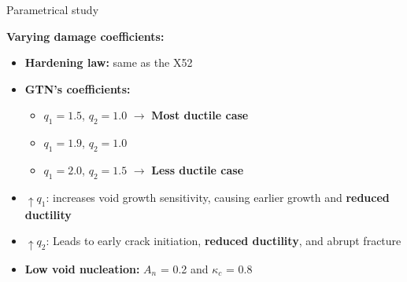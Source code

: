 \documentclass[9pt]{beamer}
\begin{document}
\begin{frame}{Parametrical study}

	\textcolor{MINESBlue}{\textbf{Varying damage coefficients:}}
	\vspace{0.3cm}
    \begin{itemize}
        \item \textbf{Hardening law:} same as the X52
        \vspace{0.5cm}
        \item \textbf{GTN's coefficients:}
        \vspace{0.2cm}
        \begin{itemize}
            \item $q_1 = 1.5$, $q_2 = 1.0$ $\rightarrow$ \textbf{Most ductile case}
            \vspace{0.2cm}
            \item $q_1 = 1.9$, $q_2 = 1.0$
            \vspace{0.2cm}
            \item $q_1 = 2.0$, $q_2 = 1.5$ $\rightarrow$ \textbf{Less ductile case}
        \end{itemize}
        \vspace{0.4cm}
        \item $\uparrow q_1$: increases void growth sensitivity, causing earlier growth and \textbf{reduced ductility}
        \vspace{0.2cm}
        \item $\uparrow q_2$: Leads to early crack initiation, \textbf{reduced ductility}, and abrupt fracture
        \vspace{0.2cm}
        \item \textbf{Low void nucleation:} $A_n$ = 0.2 and $\kappa_c$ = 0.8
    \end{itemize}

\end{frame}

\end{document}
